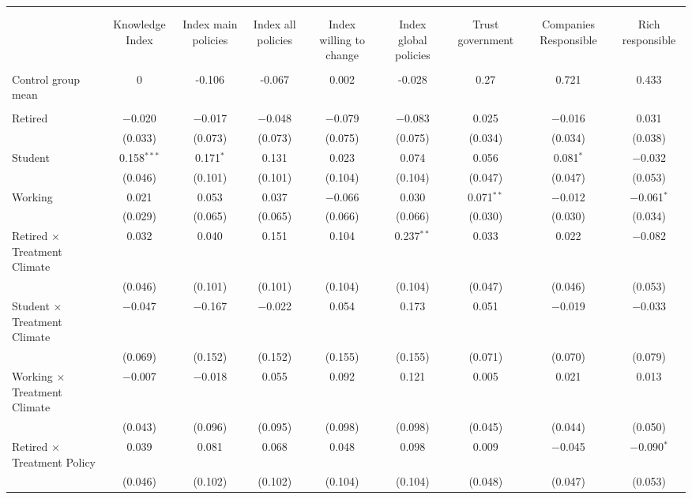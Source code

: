 
\begin{tabular}{@{\extracolsep{5pt}}lcccccccc} 
\\[-1.8ex]\hline 
\hline \\[-1.8ex] 
\\[-1.8ex] & Knowledge Index & Index main policies & Index all policies & Index willing to change & Index global policies & Trust government & Companies Responsible & Rich responsible \\ 
\hline \\[-1.8ex] 
 Control group mean & 0 & -0.106 & -0.067 & 0.002 & -0.028 & 0.27 & 0.721 & 0.433  \\ \hline \\[-1.8ex] Retired & $-$0.020 & $-$0.017 & $-$0.048 & $-$0.079 & $-$0.083 & 0.025 & $-$0.016 & 0.031 \\ 
  & (0.033) & (0.073) & (0.073) & (0.075) & (0.075) & (0.034) & (0.034) & (0.038) \\ 
 Student & 0.158$^{***}$ & 0.171$^{*}$ & 0.131 & 0.023 & 0.074 & 0.056 & 0.081$^{*}$ & $-$0.032 \\ 
  & (0.046) & (0.101) & (0.101) & (0.104) & (0.104) & (0.047) & (0.047) & (0.053) \\ 
 Working & 0.021 & 0.053 & 0.037 & $-$0.066 & 0.030 & 0.071$^{**}$ & $-$0.012 & $-$0.061$^{*}$ \\ 
  & (0.029) & (0.065) & (0.065) & (0.066) & (0.066) & (0.030) & (0.030) & (0.034) \\ 
 Retired $\times$ Treatment Climate & 0.032 & 0.040 & 0.151 & 0.104 & 0.237$^{**}$ & 0.033 & 0.022 & $-$0.082 \\ 
  & (0.046) & (0.101) & (0.101) & (0.104) & (0.104) & (0.047) & (0.046) & (0.053) \\ 
 Student $\times$ Treatment Climate & $-$0.047 & $-$0.167 & $-$0.022 & 0.054 & 0.173 & 0.051 & $-$0.019 & $-$0.033 \\ 
  & (0.069) & (0.152) & (0.152) & (0.155) & (0.155) & (0.071) & (0.070) & (0.079) \\ 
 Working $\times$ Treatment Climate & $-$0.007 & $-$0.018 & 0.055 & 0.092 & 0.121 & 0.005 & 0.021 & 0.013 \\ 
  & (0.043) & (0.096) & (0.095) & (0.098) & (0.098) & (0.045) & (0.044) & (0.050) \\ 
 Retired $\times$ Treatment Policy & 0.039 & 0.081 & 0.068 & 0.048 & 0.098 & 0.009 & $-$0.045 & $-$0.090$^{*}$ \\ 
  & (0.046) & (0.102) & (0.102) & (0.104) & (0.104) & (0.048) & (0.047) & (0.053) \\ 

\end{tabular}
